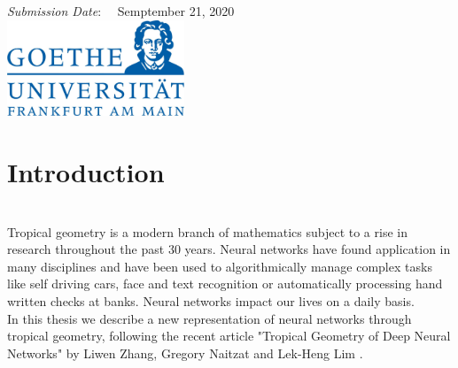 \documentclass{article}
\theoremstyle{definition}
\begin{document}
\begin{titlepage}

\vspace{15mm}
{\large \emph{Submission Date}: \ \ Semptember 21, 2020}\\[2cm] %


\includegraphics[width=200px, keepaspectratio]{graphics/logo_rug.jpg}\\[1cm] %
 

\vfill %

\end{titlepage}


%

\newpage
  
\tableofcontents

\newpage


\section{Introduction} 
\leavevmode
\\
Tropical geometry is a modern branch of mathematics subject to a rise in research throughout the past 30 years. Neural networks have found application in many disciplines and have been used to algorithmically manage complex tasks like self driving cars, face and text recognition or automatically processing hand written checks at banks. Neural networks impact our lives on a daily basis. \\
In this thesis we describe a new representation of neural networks through tropical geometry, following the recent article "Tropical Geometry of Deep Neural Networks" by Liwen Zhang, Gregory Naitzat and Lek-Heng Lim \cite{zhang2018tropical}. \\
\end{document}
